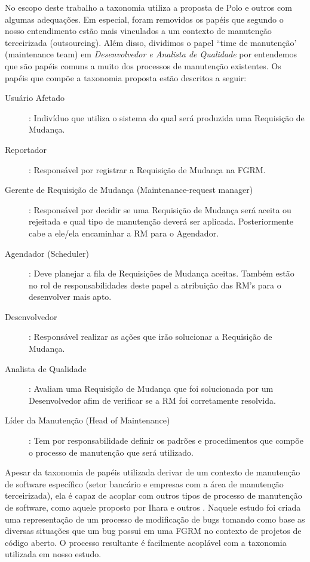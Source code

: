 No escopo deste trabalho a taxonomia utiliza a proposta de Polo e outros com algumas adequações. Em
especial, foram removidos os papéis que segundo o nosso entendimento estão mais vinculados a um
contexto de manutenção terceirizada (outsourcing). Além disso, dividimos o papel ``time de manutenção'
(maintenance team) em \textit{Desenvolvedor e Analista de Qualidade} por entendemos que são papéis
comuns a muito dos processos de manutenção existentes. Os papéis que compõe a taxonomia proposta
estão descritos a seguir:

\begin{description}
	\item[Usuário Afetado]: Indivíduo que utiliza o sistema do qual será produzida uma Requisição de
		Mudança.
	\item[Reportador]: Responsável por registrar a Requisição de Mudança na
		FGRM\@.
	\item[Gerente de Requisição de Mudança (Maintenance-request manager)]: Responsável por decidir se
		uma Requisição de Mudança será aceita ou rejeitada e qual tipo de manutenção deverá ser
		aplicada. Posteriormente cabe a ele/ela encaminhar a RM para o Agendador.
	\item[Agendador (Scheduler)]: Deve planejar a fila de Requisições de Mudança aceitas. Também
		estão no rol de responsabilidades deste papel a atribuição das RM's para o desenvolver
		mais apto.
	\item[Desenvolvedor]: Responsável realizar as ações que irão solucionar a Requisição de Mudança.
	\item[Analista de Qualidade]: Avaliam uma Requisição de Mudança que foi solucionada por um
		Desenvolvedor afim de verificar se a RM foi corretamente resolvida.
	\item[Líder da Manutenção (Head of Maintenance)]: Tem por responsabilidade definir os padrões
		e procedimentos que compõe o processo de manutenção que será utilizado.
\end{description}

Apesar da taxonomia de papéis utilizada derivar de um contexto de manutenção de software específico
(setor bancário e empresas com a área de manutenção terceirizada), ela é capaz de acoplar com outros
tipos de processo de manutenção de software, como aquele proposto por Ihara e outros
\cite{Ihara:2009:AMI:1595808.1595833}. Naquele estudo foi criada uma representação de um processo
de modificação de bugs tomando como base as diversas situações que um bug possui em uma FGRM no contexto de projetos de código aberto. O processo resultante é facilmente acoplável com a taxonomia utilizada em
nosso estudo.

